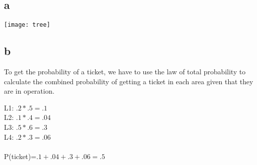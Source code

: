 \documentclass[10pt,letterpaper]{article}
\begin{document}
\subsection*{a}
\texttt{[image: tree]}

\subsection*{b}
To get the probability of a ticket, we have to use the law of total probability
to calculate the combined probability of getting a ticket in each area given
that they are in operation.

\noindent L1: $ .2*.5=.1 $\\
L2: $ .1*.4=.04 $\\
L3: $ .5*.6=.3 $\\
L4: $ .2*.3=.06 $\\
\\
P(ticket)=$ .1+.04+.3+.06=.5$
\end{document}
